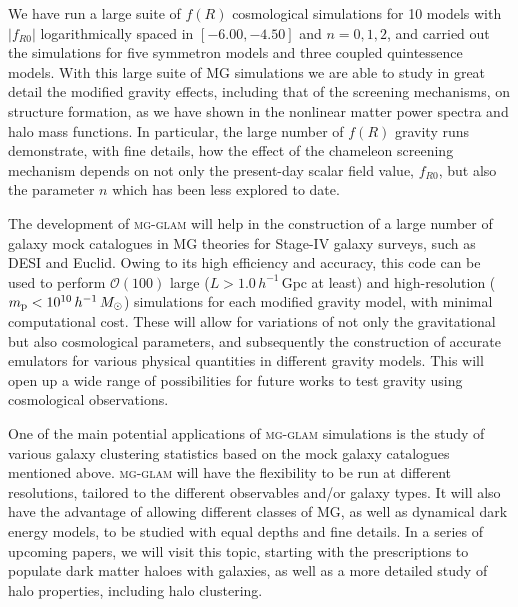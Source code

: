 We have run a large suite of $f(R)$ cosmological simulations for 10 models with $|f_{R0}|$ logarithmically spaced in $[-6.00, -4.50]$ and $n = 0, 1, 2$, and carried out the simulations for five symmetron models and three coupled quintessence models. 
With this large suite of \ac{MG} simulations we are able to study in great detail the modified gravity effects, including that of the screening mechanisms, on structure formation, as we have shown in the nonlinear matter power spectra and halo mass functions.
In particular, the large number of $f(R)$ gravity runs demonstrate, with fine details, how the effect of the chameleon screening mechanism depends on not only the present-day scalar field value, $f_{R0}$, but also the parameter $n$ which has been less explored to date.


The development of \textsc{mg-glam} will help in the construction of a large number of galaxy mock catalogues in MG theories for Stage-IV galaxy surveys, such as DESI and Euclid. 
Owing to its high efficiency and accuracy, this code can be used to perform $\mathcal{O} (100)$ large ($L > 1.0 \, h^{-1} \, \mathrm{Gpc}$ at least) and high-resolution ($m_{\rm p} < 10^{10} \, h^{-1} \, M_{\odot}$) simulations for each modified gravity model, with minimal computational cost. 
These will allow for variations of not only the gravitational but also cosmological parameters, and subsequently the construction of accurate emulators for various physical quantities in different gravity models. 
This will open up a wide range of possibilities for future works to test gravity using cosmological observations. 

One of the main potential applications of \textsc{mg-glam} simulations is the study of various galaxy clustering statistics \cite[e.g.][]{Alam:2020jdv} based on the mock galaxy catalogues mentioned above. \textsc{mg-glam} will have the flexibility to be run at different resolutions, tailored to the different observables and/or galaxy types. It will also have the advantage of allowing different classes of \ac{MG}, as well as dynamical dark energy \cite{Klypin:2020tud} models, to be studied with equal depths and fine details. In a series of upcoming papers, we will visit this topic, starting with the prescriptions to populate dark matter haloes with galaxies, as well as a more detailed study of halo properties, including halo clustering.